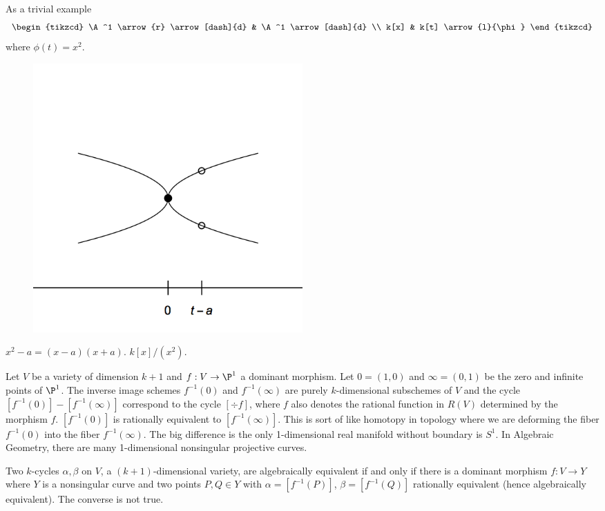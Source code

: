 \begin{ex}
As a trivial example 
	\[
	\begin{tikzcd}
	\A^1 \arrow{r} \arrow[dash]{d} & \A^1 \arrow[dash]{d} \\
	k[x] & k[t] \arrow{l}{\phi}
	\end{tikzcd}
	\]
where $\phi(t)=x^2$.

	\begin{figure}[H]
	   \centering
	   \includegraphics[width=0.5\textwidth]{parab.png} 
	\end{figure}
$x^2-a=(x-a)(x+a)$. $k[x]/(x^2)$. 	
\end{ex}

\begin{ex}
Let $V$ be a variety of dimension $k+1$ and $f: V \to \P^1$ a dominant morphism. Let $0=(1,0)$ and $\infty=(0,1)$ be the zero and infinite points of $\P^1$. The inverse image schemes $f^{-1}(0)$ and $f^{-1}(\infty)$ are purely $k$-dimensional subschemes of $V$ and the cycle $[f^{-1}(0)] - [f^{-1}(\infty)]$ correspond to the cycle $[\div f]$, where $f$ also denotes the rational function in $R(V)$ determined by the morphism $f$. $[f^{-1}(0)]$ is rationally equivalent to $[f^{-1}(\infty)]$. This is sort of like homotopy in topology where we are deforming the fiber $f^{-1}(0)$ into the fiber $f^{-1}(\infty)$. The big difference is the only 1-dimensional real manifold without boundary is $S^1$. In Algebraic Geometry, there are many 1-dimensional nonsingular projective curves. 
\end{ex}

\begin{dfn}
Two $k$-cycles $\alpha,\beta$ on $V$, a $(k+1)$-dimensional variety, are algebraically equivalent if and only if there is a dominant morphism $f: V \to Y$ where $Y$ is a nonsingular curve and two points $P,Q \in Y$ with $\alpha=[f^{-1}(P)]$, $\beta=[f^{-1}(Q)]$ rationally equivalent (hence algebraically equivalent). The converse is not true. 
\end{dfn}


